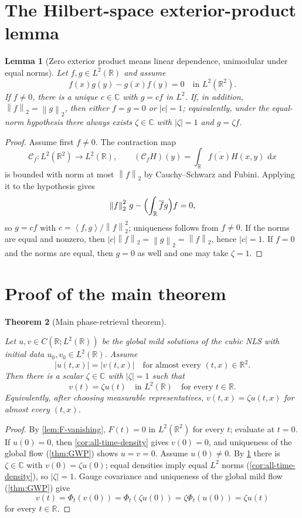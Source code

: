 \documentclass[11pt,oneside]{book}
\providecommand{\uses}[1]{}
\newtheorem{theorem}{Theorem}[chapter]
\newtheorem{lemma}[theorem]{Lemma}
\theoremstyle{definition}
\theoremstyle{remark}
\newcommand{\R}{\mathbb R}
\newcommand{\C}{\mathbb C}
\newcommand{\1}{\mathbf 1}
\newcommand{\dd}{\,\mathrm d}
\newcommand{\norm}[1]{\left\lVert #1\right\rVert}
\newcommand{\pair}[2]{\left\langle #1,#2\right\rangle}
\begin{document}
\section{The Hilbert-space exterior-product lemma}

\begin{lemma}[Zero exterior product means linear dependence, unimodular under equal norms]
\label{lem:Hilbert-wedge}
Let $f,g\in L^2(\R)$ and assume
\[
 f(x)g(y)-g(x)f(y)=0\quad\text{in }L^2(\R^2).
\]
If $f\ne0$, there is a unique $c\in\C$ with $g=cf$ in $L^2$.  If, in addition,
$\norm f_2=\norm g_2$, then either $f=g=0$ or $|c|=1$; equivalently, under the
equal-norm hypothesis there always exists $\zeta\in\C$ with $|\zeta|=1$ and
$g=\zeta f$.
\end{lemma}

\begin{proof}
Assume first $f\ne0$.  The contraction map
\[
 \mathcal C_f:L^2(\R^2)\to L^2(\R),\qquad
 (\mathcal C_fH)(y)=\int_\R\overline{f(x)}H(x,y)\,\dd x
\]
is bounded with norm at most $\norm f_2$ by Cauchy--Schwarz and Fubini.
Applying it to the hypothesis gives
\[
 \norm f_2^2\,g-\Bigl(\int_\R\overline f g\Bigr)f=0 ,
\]
so $g=cf$ with $c=\pair f g/\norm f_2^2$; uniqueness follows from $f\ne0$.  If
the norms are equal and nonzero, then $|c|\norm f_2=\norm g_2=\norm f_2$, hence
$|c|=1$.  If $f=0$ and the norms are equal, then $g=0$ as well and one may take
$\zeta=1$.
\end{proof}

\section{Proof of the main theorem}

\begin{theorem}[Main phase-retrieval theorem]\label{thm:main}
\uses{thm:GWP}
Let $u,v\in C(\R;L^2(\R))$ be the global mild solutions of the cubic NLS with
initial data $u_0,v_0\in L^2(\R)$.  Assume
\[
 |u(t,x)|=|v(t,x)|\quad\text{for almost every }(t,x)\in\R^2 .
\]
Then there is a scalar $\zeta\in\C$ with $|\zeta|=1$ such that
\[
 v(t)=\zeta u(t)\quad\text{in }L^2(\R)\quad\text{for every }t\in\R .
\]
Equivalently, after choosing measurable representatives,
$v(t,x)=\zeta u(t,x)$ for almost every $(t,x)$.
\end{theorem}

\begin{proof}
\uses{lem:F-vanishing, lem:Hilbert-wedge, thm:GWP, cor:all-time-density}
By \cref{lem:F-vanishing}, $F(t)=0$ in $L^2(\R^2)$ for every $t$; evaluate at
$t=0$.  If $u(0)=0$, then \cref{cor:all-time-density} gives $v(0)=0$, and
uniqueness of the global flow (\cref{thm:GWP}) shows $u=v=0$.  Assume
$u(0)\ne0$.  By \cref{lem:Hilbert-wedge} there is $\zeta\in\C$ with
$v(0)=\zeta u(0)$; equal densities imply equal $L^2$ norms
(\cref{cor:all-time-density}), so $|\zeta|=1$.  Gauge covariance and uniqueness
of the global mild flow (\cref{thm:GWP}) give
\[
 v(t)=\Phi_t(v(0))=\Phi_t(\zeta u(0))=\zeta\Phi_t(u(0))=\zeta u(t)
\]
for every $t\in\R$.
\end{proof}
\end{document}
